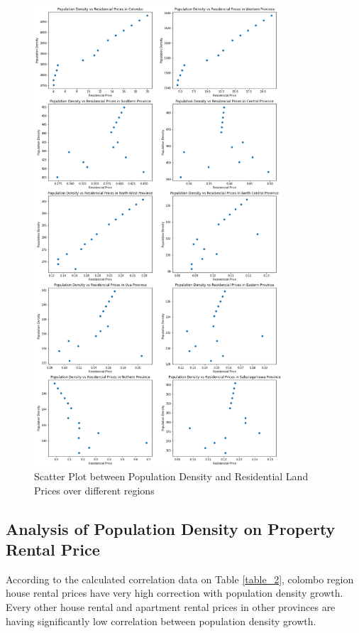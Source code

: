 \documentclass[conference]{IEEEtran}
\begin{document}
\begin{figure}
\centering
\includegraphics[width=9.25cm]{pop-den-res-price.png}
\caption{Scatter Plot between Population Density and Residential Land Prices over different regions}
\label{fig:figure1}
\end{figure}


\subsection{Analysis of Population Density on Property Rental Price}

According to the calculated correlation data on Table \ref{table_2}, colombo region house rental prices have very high correction with population density growth. Every other house rental and apartment rental prices in other provinces are having significantly low correlation between population density growth. 
\end{document}
